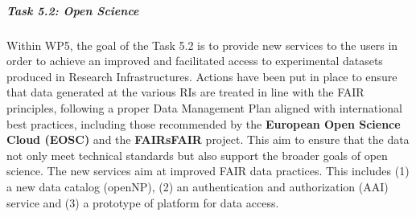 \subparagraph{Task 5.2: Open Science } \mbox{}

Within WP5, the goal of the Task 5.2 is to provide new services to the users in order to achieve an improved and facilitated access to experimental datasets produced in Research Infrastructures. 
Actions have been put in place to ensure that data generated at the various RIs are treated in line with the FAIR principles, following a proper Data Management Plan aligned with international best practices, including those recommended by the \textbf{European Open Science Cloud (EOSC)} and the \textbf{FAIRsFAIR} project. This aim to ensure that the data not only meet technical standards but also support the broader goals of open science. The new services aim at improved FAIR data practices. This includes (1) a new data catalog (openNP), (2) an authentication and authorization (AAI) service and (3) a prototype of platform for data access.

